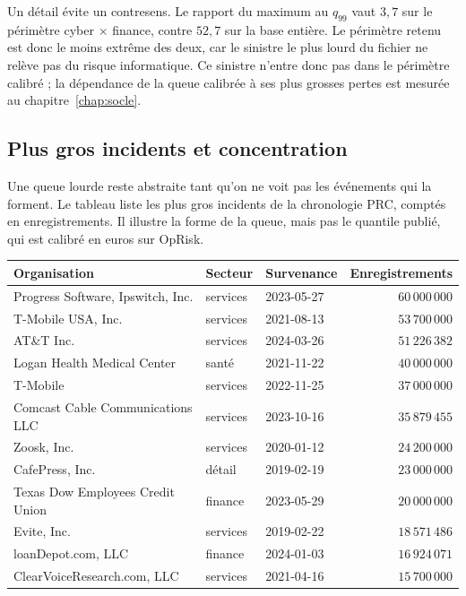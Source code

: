 Un détail évite un contresens. Le rapport du maximum au $q_{99}$ vaut $3{,}7$ sur le périmètre cyber
$\times$ finance, contre $52{,}7$ sur la base entière. Le périmètre retenu est donc le moins extrême
des deux, car le sinistre le plus lourd du fichier ne relève pas du risque informatique. Ce sinistre
n'entre donc pas dans le périmètre calibré ; la dépendance de la queue calibrée à ses plus grosses
pertes est mesurée au chapitre~\ref{chap:socle}.

\subsection{Plus gros incidents et concentration}
\label{subsec:top-incidents}

Une queue lourde reste abstraite tant qu'on ne voit pas les événements qui la forment. Le tableau
liste les plus gros incidents de la chronologie PRC, comptés en enregistrements. Il illustre la forme de
la queue, mais pas le quantile publié, qui est calibré en euros sur OpRisk.

\begin{center}\footnotesize
\renewcommand{\arraystretch}{1.08}
\begin{tabular}{@{}l l l r@{}}
\toprule
\textbf{Organisation} & \textbf{Secteur} & \textbf{Survenance} &
\textbf{Enregistrements} \\
\midrule
Progress Software, Ipswitch, Inc.     & services & 2023-05-27 & $60\,000\,000$ \\
T-Mobile USA, Inc.                    & services & 2021-08-13 & $53\,700\,000$ \\
AT\&T Inc.                            & services & 2024-03-26 & $51\,226\,382$ \\
Logan Health Medical Center           & santé    & 2021-11-22 & $40\,000\,000$ \\
T-Mobile                              & services & 2022-11-25 & $37\,000\,000$ \\
Comcast Cable Communications LLC      & services & 2023-10-16 & $35\,879\,455$ \\
Zoosk, Inc.                           & services & 2020-01-12 & $24\,200\,000$ \\
CafePress, Inc.                       & détail   & 2019-02-19 & $23\,000\,000$ \\
Texas Dow Employees Credit Union      & finance  & 2023-05-29 & $20\,000\,000$ \\
Evite, Inc.                           & services & 2019-02-22 & $18\,571\,486$ \\
loanDepot.com, LLC                    & finance  & 2024-01-03 & $16\,924\,071$ \\
ClearVoiceResearch.com, LLC           & services & 2021-04-16 & $15\,700\,000$ \\
\bottomrule
\end{tabular}
\end{center}

